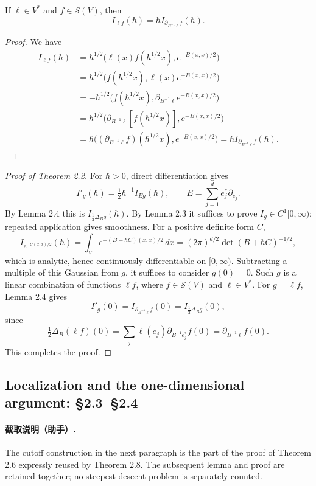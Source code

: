 \begin{lemma}[Lemma 2.4]
If $\ell\in V^*$ and $f\in\mathcal S(V)$, then
\[
I_{\ell f}(\hbar)=\hbar I_{\partial_{B^{-1}\ell}f}(\hbar).
\]
\end{lemma}
\begin{proof}
We have
\[
\begin{aligned}
I_{\ell f}(\hbar)
&=\hbar^{1/2}\bigl(\ell(x)f(\hbar^{1/2}x),e^{-B(x,x)/2}\bigr)\\
&=\hbar^{1/2}\bigl(f(\hbar^{1/2}x),\ell(x)e^{-B(x,x)/2}\bigr)\\
&=-\hbar^{1/2}\bigl(f(\hbar^{1/2}x),\partial_{B^{-1}\ell}e^{-B(x,x)/2}\bigr)\\
&=\hbar^{1/2}\bigl(\partial_{B^{-1}\ell}[f(\hbar^{1/2}x)],e^{-B(x,x)/2}\bigr)\\
&=\hbar\bigl((\partial_{B^{-1}\ell}f)(\hbar^{1/2}x),e^{-B(x,x)/2}\bigr)
=\hbar I_{\partial_{B^{-1}\ell}f}(\hbar).
\end{aligned}
\]
\end{proof}

\begin{proof}[Proof of Theorem 2.2]
For $\hbar>0$, direct differentiation gives
\[
I'_g(\hbar)=\tfrac12\hbar^{-1}I_{Eg}(\hbar),\qquad
E=\sum_{j=1}^d e_j^*\partial_{e_j}.
\]
By Lemma 2.4 this is $I_{\frac12\Delta_Bg}(\hbar)$. By Lemma 2.3 it suffices to prove $I_g\in C^1[0,\infty)$; repeated application gives smoothness.
For a positive definite form $C$,
\[
I_{e^{-C(x,x)/2}}(\hbar)
=\int_V e^{-(B+\hbar C)(x,x)/2}\,dx
=(2\pi)^{d/2}\det(B+\hbar C)^{-1/2},
\]
which is analytic, hence continuously differentiable on $[0,\infty)$. Subtracting a multiple of this Gaussian from $g$, it suffices to consider $g(0)=0$.
Such $g$ is a linear combination of functions $\ell f$, where $f\in\mathcal S(V)$ and $\ell\in V^*$. For $g=\ell f$, Lemma 2.4 gives
\[
I'_g(0)=I_{\partial_{B^{-1}\ell}f}(0)=I_{\frac12\Delta_Bg}(0),
\]
since
\[
\tfrac12\Delta_B(\ell f)(0)
=\sum_j\ell(e_j)\partial_{B^{-1}e_j^*}f(0)
=\partial_{B^{-1}\ell}f(0).
\]
This completes the proof.
\end{proof}

\subsection*{Localization and the one-dimensional argument: §2.3--§2.4}
\paragraph{截取说明（助手）.} The cutoff construction in the next paragraph is the part of the proof of Theorem 2.6 expressly reused by Theorem 2.8. The subsequent lemma and proof are retained together; no steepest-descent problem is separately counted.

